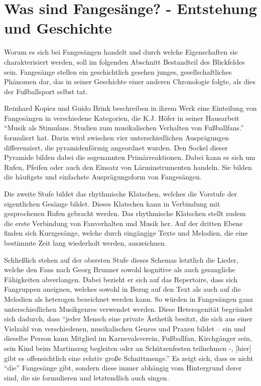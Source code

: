 \section{Was sind Fangesänge? - Entstehung und Geschichte}
Worum es sich bei Fangesängen handelt und durch welche Eigenschaften sie charakterisiert werden, soll im folgenden Abschnitt Bestandteil des Blickfeldes sein.
Fangesänge stellen ein geschichtlich gesehen junges, gesellschaftliches Phänomen dar, das in seiner Geschichte einer anderen Chronologie folgte, als dies der Fußballsport selbst tat.

Reinhard Kopiez und Guido Brink beschreiben in ihrem Werk eine Einteilung von Fangesängen in verschiedene Kategorien, die K.J. Höfer in seiner Hausarbeit "`Musik als Stimulans. Studien zum musikalischen Verhalten von Fußballfans."' formuliert hat.
Darin wird zwischen vier unterschiedlichen Ausprägungen differenziert, die pyramidenförmig angeordnet wurden.
Den Sockel dieser Pyramide bilden dabei die sogenannten Primärreaktionen.
Dabei kann es sich um Rufen, Pfeifen oder auch den Einsatz von Lärminstrumenten handeln.
Sie bilden die häufigste und einfachste Ausprägungsform von Fangesängen.

Die zweite Stufe bildet das rhythmische Klatschen, welches die Vorstufe der eigentlichen Gesänge bildet.
Dieses Klatschen kann in Verbindung mit gesprochenen Rufen gebracht werden.
Das rhythmische Klatschen stellt zudem die erste Verbindung von Fanverhalten und Musik her.
Auf der dritten Ebene finden sich Kurzgesänge, welche durch eingängige Texte und Melodien, die eine bestimmte Zeit lang wiederholt werden, auszeichnen.

Schließlich stehen auf der obersten Stufe dieses Schemas letztlich die Lieder, welche den Fans nach Georg Brunner sowohl kognitive als auch gesangliche Fähigkeiten abverlangen.
Dabei bezieht er sich auf das Repertoire, dass sich Fangruppen aneignen, welches sowohl in Bezug auf den Text als auch auf die Melodien als heterogen bezeichnet werden kann.
So würden in Fangesängen ganz unterschiedlichen Musikgenres verwendet werden.
Diese Heterogenität begründet sich dadurch, dass "`jeder Mensch eine private Ästhetik besitzt, die sich aus einer Vielzahl von verschiedenen, musikalischen Genres und Praxen bildet – ein und dieselbe Person kann Mitglied im Karnevalsverein, Fußballfan, Kirchgänger sein, sein Kind beim Martinszug begleiten oder an Schützenfesten teilnehmen -, [hier] gibt es offensichtlich eine relativ große Schnittmenge."'
Es zeigt sich, dass es nicht "`die"' Fangesänge gibt, sondern diese immer abhängig vom Hintergrund derer sind, die sie formulieren und letztendlich auch singen.

